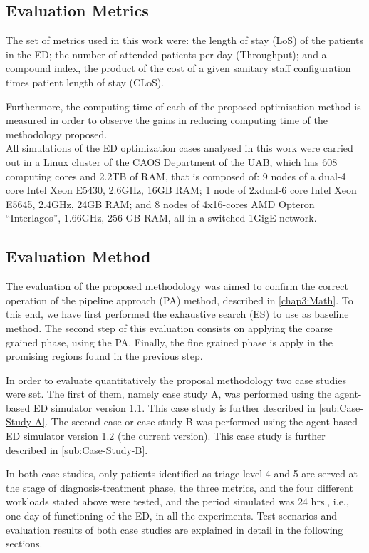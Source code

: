 \documentclass[11pt]{article} %
\begin{document}
\subsection{Evaluation Metrics}
\label{ssec:sabadell4}

The set of metrics used in this work were: the length of stay (LoS)
of the patients in the ED; the number of attended patients per day
(Throughput); and a compound index, the product of the cost of a given
sanitary staff configuration times patient length of stay (CLoS).

Furthermore, the computing time of each of the proposed optimisation
method is measured in order to observe the gains in reducing computing
time of the methodology proposed.\\


All simulations of the ED optimization cases analysed in this work
were carried out in a Linux cluster of the CAOS Department of the
UAB, which has 608 computing cores and 2.2TB of RAM, that is composed
of: 9 nodes of a dual-4 core Intel Xeon E5430, 2.6GHz, 16GB RAM; 1
node of 2xdual-6 core Intel Xeon E5645, 2.4GHz, 24GB RAM; and 8 nodes
of 4x16-cores AMD Opteron ``Interlagos'', 1.66GHz, 256 GB RAM, all
in a switched 1GigE network.

\subsection{Evaluation Method}
\label{ssec:sabadell5}


The evaluation of the proposed methodology was aimed to confirm the
correct operation of  the pipeline approach (PA) method, described in \ref{chap3:Math}. To this end,
we have first performed the exhaustive search (ES) to use as baseline
method. The second step of this evaluation consists on applying the
coarse grained phase, using  the PA. Finally, the fine grained phase is apply in the promising
regions found in the previous step. 

In order to evaluate quantitatively the proposal methodology two case
studies were set. The first of them, namely case study A, was performed
using the agent-based ED simulator version 1.1. This case study is
further described in \ref{sub:Case-Study-A}. The second case or case
study B was performed using the agent-based ED simulator version 1.2
(the current version). This case study is further described in \ref{sub:Case-Study-B}.

In both case studies, only patients identified as triage level 4 and
5 are served at the stage of diagnosis-treatment phase, the three
metrics, and the four different workloads stated above were tested,
and the period simulated was 24 hrs., i.e., one day of functioning
of the ED, in all the experiments. Test scenarios and evaluation results
of both case studies are explained in detail in the following sections.\\
\end{document}
